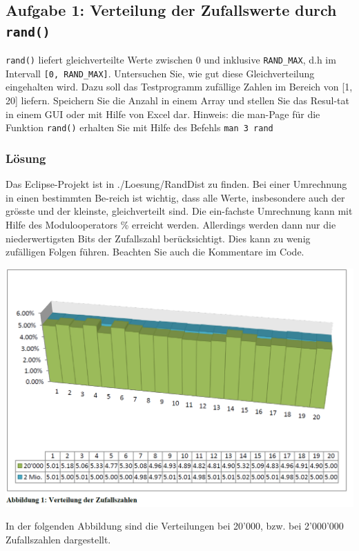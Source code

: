 \subsection{Aufgabe 1: Verteilung der Zufallswerte durch \texttt{rand()}}

\texttt{rand()} liefert gleichverteilte Werte zwischen 0 und inklusive \texttt{RAND\_MAX}, d.h im Intervall \texttt{[0, RAND\_MAX]}. Untersuchen Sie, wie gut diese Gleichverteilung eingehalten wird. Dazu soll das Testprogramm zufällige Zahlen im Bereich von [1, 20] liefern. Speichern Sie die Anzahl in einem Array und stellen Sie das Resul-tat in einem GUI oder mit Hilfe von Excel dar.
Hinweis: die man-Page für die Funktion \texttt{rand()} erhalten Sie mit Hilfe des Befehls \texttt{man 3 rand}

\subsubsection{Lösung}

Das Eclipse-Projekt ist in ./Loesung/RandDist zu finden. Bei einer Umrechnung in einen bestimmten Be-reich ist wichtig, dass alle Werte, insbesondere auch der grösste und der kleinste, gleichverteilt sind. Die ein-fachste Umrechnung kann mit Hilfe des Modulooperators \% erreicht werden. Allerdings werden dann nur die niederwertigsten Bits der Zufallszahl berücksichtigt. Dies kann zu wenig zufälligen Folgen führen. Beachten Sie auch die Kommentare im Code.

\includegraphics[width=.8\linewidth]{900-Praktika/prak04/pic.PNG}

In der folgenden Abbildung sind die Verteilungen bei 20'000, bzw. bei 2'000'000 Zufallszahlen dargestellt.




